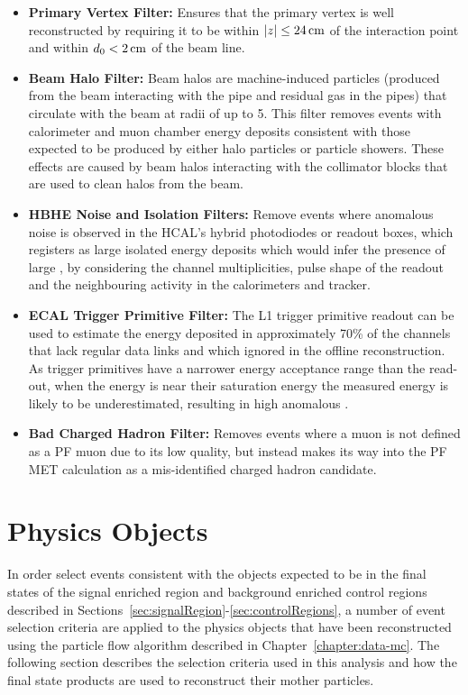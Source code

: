 \begin{itemize}
\item \textbf{Primary Vertex Filter:} Ensures that the primary vertex is well reconstructed by requiring it to be within $|z| \leq 24\,\text{cm}$ of the interaction point and within $d_{0} < 2\,\text{cm}$ of the beam line.
\item \textbf{Beam Halo Filter:} Beam halos are machine-induced particles (\ie produced from the beam interacting with the pipe and residual gas in the pipes) that circulate with the beam at radii of up to 5\cm. This filter removes events with calorimeter and muon chamber energy deposits consistent with those expected to be produced by either halo particles or particle showers.
These effects are caused by beam halos interacting with the collimator blocks that are used to clean halos from the beam.
\item \textbf{HBHE Noise and Isolation Filters:} Remove events where anomalous noise is observed in the HCAL's hybrid photodiodes or readout boxes, which registers as large isolated energy deposits which would infer the presence of large \MET, by considering the channel multiplicities, pulse shape of the readout and the neighbouring activity in the calorimeters and tracker.
\item \textbf{ECAL Trigger Primitive Filter:} The L1 trigger primitive readout can be used to estimate the energy deposited in approximately 70\% of the channels that lack regular data links and which ignored in the offline reconstruction. As trigger primitives have a narrower energy acceptance range than the read-out, when the energy is near their saturation energy the measured energy is likely to be underestimated, resulting in high anomalous \MET. 
\item \textbf{Bad Charged Hadron Filter:} Removes events where a muon is not defined as a PF muon due to its low quality, but instead makes its way into the PF MET calculation as a mis-identified charged hadron candidate.
\end{itemize}

\section{Physics Objects}\label{sec:physicsObjects}
In order select events consistent with the objects expected to be in the final states of the signal enriched region and background enriched control regions described in Sections~\ref{sec:signalRegion}-\ref{sec:controlRegions}, a number of event selection criteria are applied to the physics objects that have been reconstructed using the particle flow algorithm described in Chapter~\ref{chapter:data-mc}.
The following section describes the selection criteria used in this analysis and how the final state products are used to reconstruct their mother particles.

